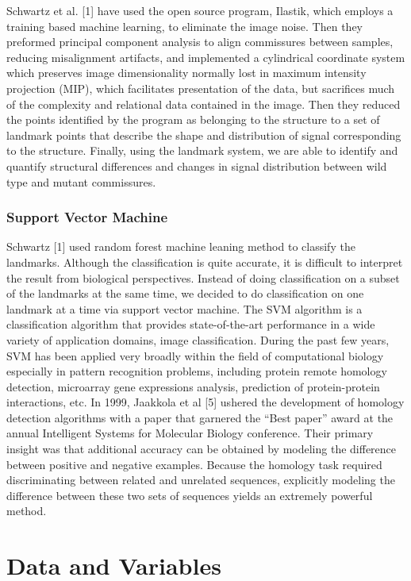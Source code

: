 \documentclass[10pt,letterpaper]{article}
\begin{document}
Schwartz et al. {[}1{]} have used the open source program, Ilastik,
which employs a training based machine learning, to eliminate the image
noise. Then they preformed principal component analysis to align
commissures between samples, reducing misalignment artifacts, and
implemented a cylindrical coordinate system which preserves image
dimensionality normally lost in maximum intensity projection (MIP),
which facilitates presentation of the data, but sacrifices much of the
complexity and relational data contained in the image. Then they reduced
the points identified by the program as belonging to the structure to a
set of landmark points that describe the shape and distribution of
signal corresponding to the structure. Finally, using the landmark
system, we are able to identify and quantify structural differences and
changes in signal distribution between wild type and mutant commissures.

\subsubsection{Support Vector Machine}\label{support-vector-machine}

Schwartz {[}1{]} used random forest machine leaning method to classify
the landmarks. Although the classification is quite accurate, it is
difficult to interpret the result from biological perspectives. Instead
of doing classification on a subset of the landmarks at the same time,
we decided to do classification on one landmark at a time via support
vector machine. The SVM algorithm is a classification algorithm that
provides state-of-the-art performance in a wide variety of application
domains, image classification. During the past few years, SVM has been
applied very broadly within the field of computational biology
especially in pattern recognition problems, including protein remote
homology detection, microarray gene expressions analysis, prediction of
protein-protein interactions, etc. In 1999, Jaakkola et al {[}5{]}
ushered the development of homology detection algorithms with a paper
that garnered the ``Best paper'' award at the annual Intelligent Systems
for Molecular Biology conference. Their primary insight was that
additional accuracy can be obtained by modeling the difference between
positive and negative examples. Because the homology task required
discriminating between related and unrelated sequences, explicitly
modeling the difference between these two sets of sequences yields an
extremely powerful method.

\section{Data and Variables}\label{data-and-variables}
\end{document}
